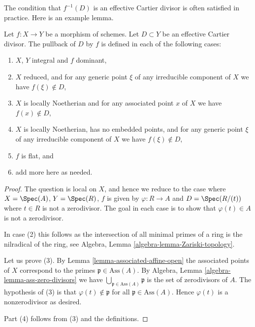 \noindent
The condition that $f^{-1}(D)$ is an effective Cartier divisor
is often satisfied in practice. Here is an example lemma.

\begin{lemma}
\label{lemma-pullback-effective-Cartier-defined}
Let $f : X \to Y$ be a morphism of schemes.
Let $D \subset Y$ be an effective Cartier divisor.
The pullback of $D$ by $f$ is defined in each of the following cases:
\begin{enumerate}
\item $X$, $Y$ integral and $f$ dominant,
\item $X$ reduced, and for any generic point $\xi$ of any
irreducible component of $X$ we have $f(\xi) \not \in D$,
\item $X$ is locally Noetherian and for any associated point
$x$ of $X$ we have $f(x) \not \in D$,
\item $X$ is locally Noetherian, has no embedded points, and
for any generic point $\xi$ of any irreducible component of
$X$ we have $f(\xi) \not \in D$,
\item $f$ is flat, and
\item add more here as needed.
\end{enumerate}
\end{lemma}

\begin{proof}
The question is local on $X$, and hence we reduce to the case
where $X = \Spec(A)$, $Y = \Spec(R)$, $f$ is
given by $\varphi : R \to A$ and
$D = \Spec(R/(t))$ where $t \in R$ is not a zerodivisor.
The goal in each case is to show that $\varphi(t) \in A$
is not a zerodivisor.

\medskip\noindent
In case (2) this follows as the intersection of all minimal
primes of a ring is the nilradical of the ring, see
Algebra, Lemma \ref{algebra-lemma-Zariski-topology}.

\medskip\noindent
Let us prove (3). By
Lemma \ref{lemma-associated-affine-open}
the associated points of $X$ correspond to the primes
$\mathfrak p \in \text{Ass}(A)$.
By Algebra, Lemma \ref{algebra-lemma-ass-zero-divisors} we have
$\bigcup_{\mathfrak p \in \text{Ass}(A)} \mathfrak p$ is
the set of zerodivisors of $A$. The hypothesis of
(3) is that $\varphi(t) \not \in \mathfrak p$ for
all $\mathfrak p \in \text{Ass}(A)$. Hence $\varphi(t)$
is a nonzerodivisor as desired.

\medskip\noindent
Part (4) follows from (3) and the definitions.
\end{proof}

